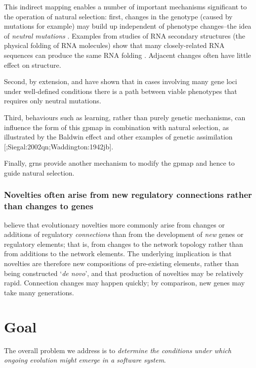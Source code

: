 This indirect mapping enables a number of important mechanisms
significant to the operation of natural selection: first, changes in the
genotype (caused by mutations for example) may build up independent of
phenotype changes--the idea of \emph{neutral mutations}
\autocite{Ohta:1996vn,Ohta:2002ys,Ohta:1973kx}. Examples from studies
of RNA secondary structures (the physical folding of RNA molecules) show
that many closely-related RNA sequences can produce the same RNA folding
\autocite{Fontana:1993zn}. Adjacent changes often have little effect on
structure.

Second, by extension, \autocite{Gavrilets:1997qt} and
\autocite{Gravner:2007yd} have shown that in cases involving many gene
loci under well-defined conditions there is a path between viable
phenotypes that requires only neutral mutations.

Third, behaviours such as learning, rather than purely genetic
mechanisms, can influence the form of this \gls{gpmap} in combination
with natural selection, as illustrated by the Baldwin effect
\autocite{Baldwin:1896ly} and other examples of genetic assimilation
{[}\autocite{Hinton:1987vy};Siegal:2002qn;Waddington:1942jb{]}.

Finally, \glspl{grn} provide another mechanism to modify the \gls{gpmap}
and hence to guide natural selection.

\subsubsection{Novelties often arise from new regulatory connections rather than changes to genes}
\label{novelties-often-arise-from-new-regulatory-connections-rather-than-changes-to-genes}

\autocite{Prudhomme:2007ax} believe that evolutionary novelties more
commonly arise from changes or additions of regulatory
\emph{connections} than from the development of \emph{new} genes or
regulatory elements; that is, from changes to the network topology
rather than from additions to the network elements. The underlying
implication is that novelties are therefore new compositions of
pre-existing elements, rather than being constructed `\emph{de novo}',
and that production of novelties may be relatively rapid. Connection
changes may happen quickly; by comparison, new genes may take many generations.

\section{Goal}
The overall problem we address is to \textit{determine the conditions under which ongoing evolution might emerge in a software system}. 

